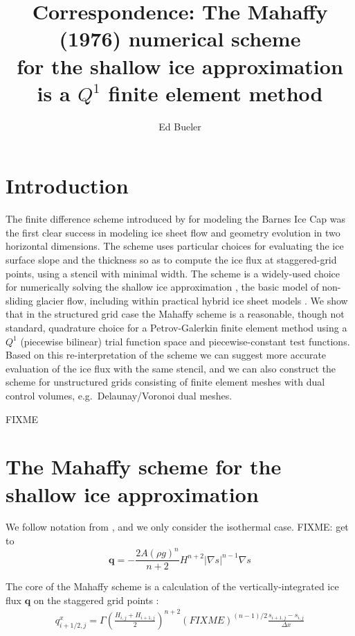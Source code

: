 \documentclass[11pt]{amsart}
\title{Correspondence: The Mahaffy (1976) numerical scheme \\ for the shallow ice approximation \\ is a $Q^1$ finite element method}
\author{Ed Bueler}
\newcommand\bq{\mathbf{q}}
\newcommand{\grad}{\nabla}
\begin{document}

\maketitle

\thispagestyle{empty}


\section{Introduction}

The finite difference scheme introduced by \cite{Mahaffy1976} for modeling the Barnes Ice Cap was the first clear success in modeling ice sheet flow and geometry evolution in two horizontal dimensions.  The scheme uses particular choices for evaluating the ice surface slope and the thickness so as to compute the ice flux at staggered-grid points, using a stencil with minimal width.  The scheme is a widely-used choice for numerically solving the shallow ice approximation \cite{vanderVeen2013}, the basic model of non-sliding glacier flow, including within practical hybrid ice sheet models \cite{BuelerBrown2009}.  We show that in the structured grid case the Mahaffy scheme is a reasonable, though not standard, quadrature choice for a Petrov-Galerkin finite element method using a $Q^1$ (piecewise bilinear) trial function space and piecewise-constant test functions.  Based on this re-interpretation of the scheme we can suggest more accurate evaluation of the ice flux with the same stencil, and we can also construct the scheme for unstructured grids consisting of finite element meshes with dual control volumes, e.g.~Delaunay/Voronoi dual meshes.

FIXME

\section{The Mahaffy scheme for the shallow ice approximation}  We follow notation from \cite{Bueleretal2005}, and we only consider the isothermal case.  FIXME: get to
\begin{equation}
\bq = - \frac{2 A (\rho g)^n}{n+2} H^{n+2} |\grad s|^{n-1} \grad s
\end{equation}

The core of the Mahaffy scheme is a calculation of the vertically-integrated ice flux $\bq$ on the staggered grid points \cite[equations (19), (20)]{Mahaffy1976}:
\begin{align*}
q^x_{i+1/2,j} = \Gamma \left(\frac{H_{i,j} + H_{i+1,j}}{2}\right)^{n+2} \left(FIXME\right)^{(n-1)/2} \frac{s_{i+1,j} - s_{i,j}}{\Delta x}
\end{align*}
\end{document}
